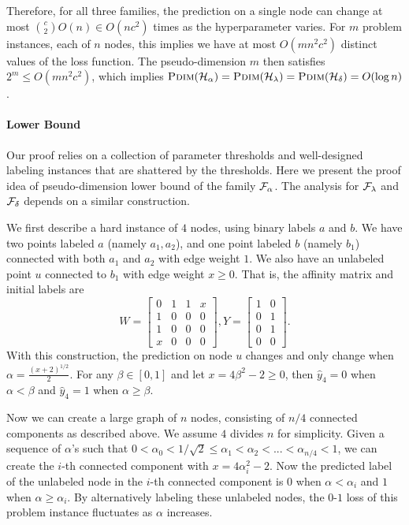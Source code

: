 \noindent Therefore, for all three families, the prediction on a single node can change at most $\binom{c}{2}O(n) \in O(nc^2)$ times as the hyperparameter varies.
For $m$ problem instances, each of $n$ nodes, this implies we have at most $O(mn^2c^2)$ distinct values of the loss function. The pseudo-dimension $m$ then satisfies $2^m \leq O(mn^2c^2)$, which implies $\textsc{Pdim}(\mathcal{H}_{\alpha}) = \textsc{Pdim}(\mathcal{H}_{\lambda}) = \textsc{Pdim}(\mathcal{H}_{\delta}) = O(\log n)$. 

\paragraph{Lower Bound}
Our proof relies on a collection of parameter thresholds and well-designed labeling instances that are shattered by the thresholds. Here we present the proof idea of pseudo-dimension lower bound of the family $\mathcal{F}_\alpha$. The analysis for $\mathcal{F}_\lambda$ and $\mathcal{F}_\delta$ depends on a similar construction. 

We first describe a hard instance of $4$ nodes, using binary labels $a$ and $b$. We have two points labeled $a$ (namely $a_1, a_2$), and one point labeled $b$ (namely $b_1$) connected with both $a_1$ and $a_2$ with edge weight $1$. We also have an unlabeled point $u$ connected to $b_1$ with edge weight $x \geq 0$. That is, the affinity matrix and initial labels are $$W = \begin{bmatrix}
    0 & 1 & 1 & x\\
    1 & 0 & 0 & 0\\
    1 & 0 & 0 & 0\\
    x & 0 & 0 & 0
    \end{bmatrix}, Y = \begin{bmatrix}
    1 & 0 \\
    0 & 1 \\
    0 & 1 \\
    0 & 0 
    \end{bmatrix}.$$
With this construction, the prediction on node $u$ changes and only change when $\alpha = \frac{(x+2)^{1/2}}{2}$. For any $\beta \in [0,1]$ and let $x = 4\beta^2 - 2 \geq 0$, then $\hat y_4 = 0$ when $\alpha < \beta$ and $\hat y_4 = 1$  when $\alpha \geq \beta$.

Now we can create a large graph of $n$ nodes, consisting of $n/4$ connected components as described above. We assume $4$ divides $n$ for simplicity. Given a sequence of $\alpha$'s such that $0 < \alpha_0 < 1/\sqrt{2} \leq  \alpha_1 < \alpha_2 < ... < \alpha_{n/4} < 1$, we can create the $i$-th connected component with $x = 4\alpha_i^2 -2$. Now the predicted label of the unlabeled node in the $i$-th connected component is $0$ when $\alpha < \alpha_i$ and $1$ when $\alpha \geq \alpha_i$. By alternatively labeling these unlabeled nodes, the $0$-$1$ loss of this problem instance fluctuates as $\alpha$ increases.
    
